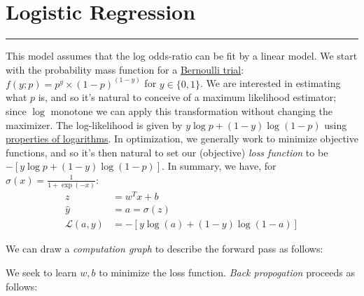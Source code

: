 \documentclass[12pt]{article}
\begin{document}
\renewcommand{\d}[1]{\ensuremath{\operatorname{d}\!{#1}}}

\section{Logistic Regression}\vspace{.1pt} \hrule height 2pt \smallskip \renewcommand{\arraystretch}{1}%
This model assumes that the log odds-ratio can be fit by a linear model. We start with the probability mass function for a \href{https://en.wikipedia.org/wiki/Bernoulli_distribution}{Bernoulli trial}: $f(y;p) = p^y \times (1-p)^{(1-y)}$ for $y \in \{0, 1\}$. We are interested in estimating what $p$ is, and so it's natural to conceive of a maximum likelihood estimator; since $\log$ monotone we can apply this transformation without changing the maximizer. The log-likelihood is given by $y \log p + (1-y) \log (1-p)$ using \href{https://en.wikipedia.org/wiki/Logarithm#Logarithmic_identities}{properties of logarithms}. In optimization, we generally work to minimize objective functions, and so it's then natural to set our (objective) \emph{loss function}
to be $- \left[y \log p + (1-y) \log (1-p)\right]$. In summary, we 
have, for $\sigma(x) = \frac{1}{1 + \exp(-x)}$:
\begin{align}
  z &= w^Tx + b \\
  \hat y &= a = \sigma(z) \\
  \mathcal{L}(a, y) &= - \left[y \log (a) + (1-y) \log (1-a)\right] \end{align}

We can draw a \emph{computation graph} to describe the forward pass as follows:
\begin{center}
\end{center} We seek to learn $w, b$ to minimize the loss function. \emph{Back propogation} proceeds as follows:
\end{document}
